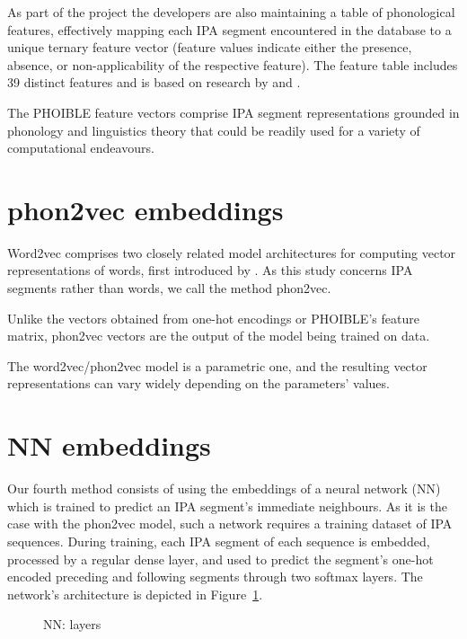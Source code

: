 \documentclass[a4paper]{report}
\begin{document}
As part of the project the developers are also maintaining a table of phonological features,
effectively mapping each IPA segment encountered in the database to a unique ternary feature vector
(feature values indicate either the presence, absence, or non-applicability of the respective feature).
The feature table includes 39 distinct features and is based on research by \citet{2009_Bruce} and \citet{2011_Moisik_al}.

The PHOIBLE feature vectors comprise IPA segment representations grounded in phonology and linguistics theory
that could be readily used for a variety of computational endeavours.


\section{phon2vec embeddings}

Word2vec comprises two closely related model architectures for computing vector representations of words, first introduced by \citet{2013_Mikolov_al}.
As this study concerns IPA segments rather than words, we call the method phon2vec.

Unlike the vectors obtained from one-hot encodings or PHOIBLE's feature matrix, phon2vec vectors are the output of the model being trained on data.

The word2vec/phon2vec model is a parametric one, and the resulting vector representations can vary widely depending on the parameters' values.


\section{NN embeddings}

Our fourth method consists of using the embeddings of a neural network (NN) which is trained to predict an IPA segment's immediate neighbours.
As it is the case with the phon2vec model, such a network requires a training dataset of IPA sequences.
During training, each IPA segment of each sequence is embedded, processed by a regular dense layer,
and used to predict the segment's one-hot encoded preceding and following segments through two softmax layers.
The network's architecture is depicted in Figure~\ref{fig:nn}.

\begin{figure}[h]
	\centering\small


	\caption{NN: layers}
	\label{fig:nn}
\end{figure}
\end{document}
